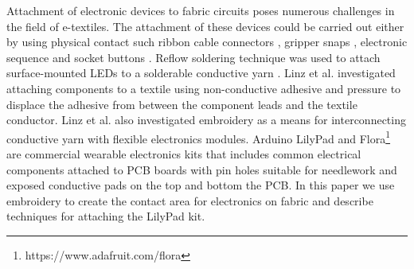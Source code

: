 Attachment of electronic devices to fabric circuits poses numerous challenges in the field of e-textiles. 
The attachment of these devices could be carried out either by using physical contact such ribbon cable connectors \cite{lehn2004tags}, gripper snaps \cite{5387040}, electronic sequence and socket buttons \cite{Buechley2009}. Reflow soldering technique was used to attach surface-mounted LEDs to a solderable conductive yarn \cite{Berglund:2015:SCA:2802083.2808413, Molla:2017:SME:3123021.3123058}. Linz et al. \cite{linz2012contacting} investigated attaching  components to a textile using non-conductive adhesive and pressure to displace the adhesive from between the component leads and the textile conductor. Linz et al. \cite{linz2005embroidering} also investigated embroidery as a means for interconnecting conductive yarn with flexible electronics modules. Arduino LilyPad \cite{4487082} and Flora\footnote{https://www.adafruit.com/flora} are commercial wearable electronics kits that includes common electrical components attached to PCB boards with pin holes suitable for needlework and exposed conductive pads on the top and bottom the PCB. In this paper we use embroidery to create the contact area for electronics on fabric and describe techniques for attaching the LilyPad kit. 


